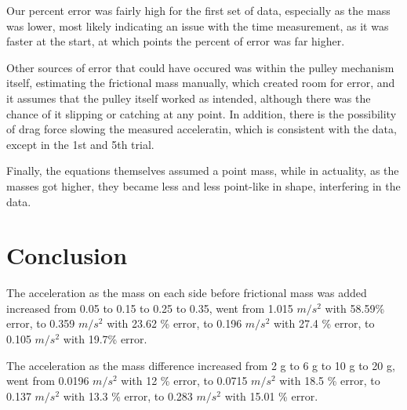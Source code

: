\documentclass[11pt, titlepage]{article}
\begin{document}
Our percent error was fairly high for the first set of data, especially as the mass was lower, most likely indicating an issue with the time measurement, as it was faster at the start, at which points the percent of error was far higher. 

Other sources of error that could have occured was within the pulley mechanism itself, estimating the frictional mass manually, which created room for error, and it assumes that the pulley itself worked as intended, although there was the chance of it slipping or catching at any point. In addition, there is the possibility of drag force slowing the measured acceleratin, which is consistent with the data, except in the 1st and 5th trial.

Finally, the equations themselves assumed a point mass, while in actuality, as the masses got higher, they became less and less point-like in shape, interfering in the data.

\section*{Conclusion}

The acceleration as the mass on each side before frictional mass was added increased from 0.05 to 0.15 to 0.25 to 0.35, went from 1.015 $m/s^2$ with 58.59\% error, to 0.359 $m/s^2$ with 23.62 \% error, to 0.196 $m/s^2$ with 27.4 \% error, to 0.105 $m/s^2$ with 19.7\% error.

The acceleration as the mass difference increased from 2 g to 6 g to 10 g to 20 g, went from 0.0196 $m/s^2$ with 12 \% error, to 0.0715 $m/s^2$ with 18.5 \% error, to 0.137 $m/s^2$ with 13.3 \% error, to 0.283 $m/s^2$ with 15.01 \% error. 
\end{document}
